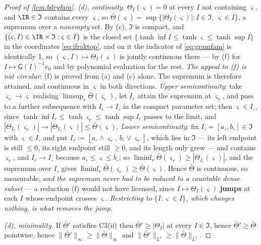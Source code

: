 \begin{proof}[Proof of \cref{lem:bdryfam}]
\emph{(d), continuity.} $\Theta_I(\varsigma)=0$ at every $I$ not containing $\varsigma$, and
$\IR\in\mathfrak I$ contains every $\varsigma$, so
$\bar\Theta(\varsigma)=\sup\{|\Theta_I(\varsigma)|:I\in\mathfrak I,\ \varsigma\in I\}$, a supremum over a
\emph{nonempty} set. By (c), $\mathfrak I$ is compact, and $\{(\varsigma,I)\in\IR\times\mathfrak I:\varsigma\in I\}$ is
the closed set $\{\tanh\inf I\le\tanh\varsigma\le\tanh\sup I\}$ in the coordinates \eqref{eq:ifraktop},
and on it the indicator of \eqref{eq:gramfam} is identically $1$, so $(\varsigma,I)\mapsto\Theta_I(\varsigma)$
is jointly continuous there --- by (f) for $I\mapsto\mathsf G(I)^{-1}e_0$ and by polynomial evaluation
for the rest. \emph{The appeal to \textup{(f)} is not circular}: \textup{(f)} is proved from \textup{(a)}
and \textup{(c)} alone. The supremum is therefore attained, and continuous in $\varsigma$ in both
directions. \emph{Upper semicontinuity}: take $\varsigma_r\to\varsigma$ realising
$\limsup_r\bar\Theta(\varsigma_r)$, let $I_r$ attain the supremum at $\varsigma_r$, and pass to a further
subsequence with $I_r\to I_\circ$ in the compact parameter set; then $\varsigma\in I_\circ$, since
$\tanh\inf I_r\le\tanh\varsigma_r\le\tanh\sup I_r$ passes to the limit, and
$|\Theta_{I_r}(\varsigma_r)|\to|\Theta_{I_\circ}(\varsigma)|\le\bar\Theta(\varsigma)$.
\emph{Lower semicontinuity}: fix $I_\circ=[a_\circ,b_\circ]\in\mathfrak I$ with $\varsigma\in I_\circ$
and put $I_r:=[a_\circ\wedge\varsigma_r,\ b_\circ\vee\varsigma_r]$, which lies in $\mathfrak I$ --- its
left endpoint is still $\le0$, its right endpoint still $\ge0$, and its length only grew --- and contains
$\varsigma_r$, and $I_r\to I_\circ$ because $a_\circ\le\varsigma\le b_\circ$; so
$\liminf_r\bar\Theta(\varsigma_r)\ge|\Theta_{I_\circ}(\varsigma)|$, and the supremum over $I_\circ$ gives
$\liminf_r\bar\Theta(\varsigma_r)\ge\bar\Theta(\varsigma)$. Hence $\bar\Theta$ is continuous, so
measurable, \emph{and the supremum never had to be reduced to a countable dense subset} --- a reduction
\textup{(f)} would not have licensed, since $I\mapsto\Theta_I(\varsigma)$ \textbf{jumps} at each $I$ whose
endpoint crosses $\varsigma$. \emph{Restricting to $\{I:\varsigma\in I\}$, which changes nothing, is what
removes the jump.}

\emph{(d), minimality.} If $\bar\Theta'$ satisfies C3(ii) then $\bar\Theta'\ge|\Theta_I|$ at every
$I\in\mathfrak I$, hence $\bar\Theta'\ge\bar\Theta$ pointwise, hence $\|\bar\Theta'\|_\infty\ge\|\bar\Theta\|_\infty$
and $\|\bar\Theta'\|_{L^{1}}\ge\|\bar\Theta\|_{L^{1}}$.


\end{proof}
